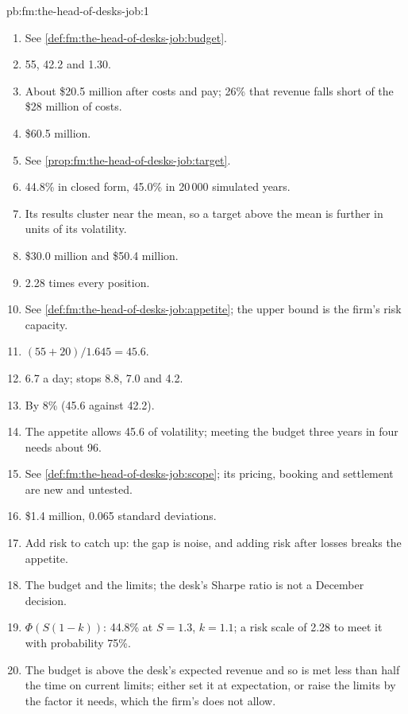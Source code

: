 \begin{solution}{pb:fm:the-head-of-desks-job:1}
\begin{enumerate}
\item See \cref{def:fm:the-head-of-desks-job:budget}.
\item 55, 42.2 and 1.30.
\item About \$20.5 million after costs and pay; 26\% that revenue falls short of the \$28 million of costs.
\item \$60.5 million.
\item See \cref{prop:fm:the-head-of-desks-job:target}.
\item 44.8\% in closed form, 45.0\% in 20\,000 simulated years.
\item Its results cluster near the mean, so a target above the mean is further in units of its volatility.
\item \$30.0 million and \$50.4 million.
\item 2.28 times every position.
\item See \cref{def:fm:the-head-of-desks-job:appetite}; the upper bound is the firm's risk capacity.
\item $(55+20)/1.645=45.6$.
\item 6.7 a day; stops 8.8, 7.0 and 4.2.
\item By 8\% (45.6 against 42.2).
\item The appetite allows 45.6 of volatility; meeting the budget three years in four needs about 96.
\item See \cref{def:fm:the-head-of-desks-job:scope}; its pricing, booking and settlement are new and untested.
\item \$1.4 million, 0.065 standard deviations.
\item Add risk to catch up: the gap is noise, and adding risk after losses breaks the appetite.
\item The budget and the limits; the desk's Sharpe ratio is not a December decision.
\item $\Phi(S(1-k))$: 44.8\% at $S=1.3$, $k=1.1$; a risk scale of 2.28 to meet it with probability 75\%.
\item The budget is above the desk's expected revenue and so is met less than half the time on current limits; either set it at expectation, or
raise the limits by the factor it needs, which the firm's  does not allow.
\end{enumerate}
\end{solution}

